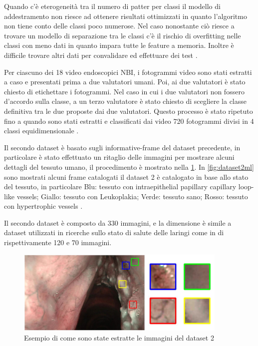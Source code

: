 Quando c'è eterogeneità tra il numero di patter per classi il modello di addestramento non riesce ad ottenere risultati ottimizzati in quanto l'algoritmo non tiene conto delle classi poco numerose. Nel caso nonostante ciò riesce a trovare un modello di separazione tra le classi c'è il rischio di overfitting nelle classi con meno dati in quanto impara tutte le feature a memoria. Inoltre è difficile trovare altri dati per convalidare ed effettuare dei test \cite{chatterjee_deep_2018}.

Per ciascuno dei 18 video endoscopici NBI, i fotogrammi video sono stati estratti a caso e
presentati prima a due valutatori umani. Poi, ai due valutatori è stato chiesto di etichettare i fotogrammi. Nel caso in cui i due
valutatori non fossero d'accordo sulla classe, a un terzo valutatore è stato
chiesto di scegliere la classe definitiva tra le due proposte
dai due valutatori. Questo processo è stato ripetuto fino a quando sono stati estratti e classificati dai video 720 fotogrammi divisi in 4 classi equidimensionale \cite{moccia_larynge}.

Il secondo dataset è basato sugli informative-frame del dataset precedente, in particolare è stato effettuato un ritaglio delle immagini per mostrare   alcuni dettagli del tessuto umano, il procedimento è mostrato nella \cref{fig:dataset2}. In \cref{fig:dataset2ml} sono mostrati alcuni frame catalogati il dataset 2 è catalogato in base allo stato del tessuto, in particolare Blu: tessuto con intraepithelial papillary capillary loop-like vessels; Giallo: tessuto con Leukoplakia;
Verde: tessuto sano; Rosso: tessuto con hypertrophic vessels \cite{moccia_larynge}.

Il secondo dataset è composto da 330 immagini, e la dimensione è simile a dataset utilizzati in ricerche sullo stato di salute delle laringi come in \cite{narbalata_larynge} \cite{turkmen_larynge} di rispettivamente 120 e 70 immagini.

\begin{figure}[ht]
    \centering
    \includegraphics[width=0.9\textwidth]{introduzione/dataset-2.JPG}
    \caption{Esempio di come sono state estratte le immagini del dataset 2}
    \label{fig:dataset2}
\end{figure}

